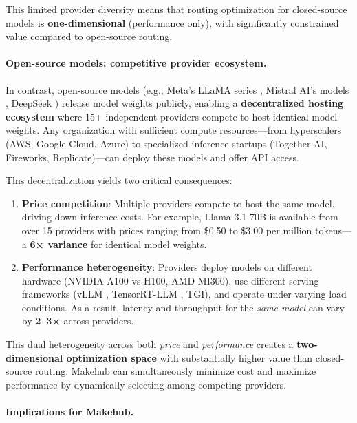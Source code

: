 \documentclass[english]{article}
\begin{document}
This limited provider diversity means that routing optimization for closed-source models is \textbf{one-dimensional} (performance only), with significantly constrained value compared to open-source routing.

\paragraph{Open-source models: competitive provider ecosystem.}

In contrast, open-source models (e.g., Meta's LLaMA series \parencite{llama2023,llama3_2024}, Mistral AI's models \parencite{mistral2023}, DeepSeek \parencite{deepseek_v3}) release model weights publicly, enabling a \textbf{decentralized hosting ecosystem} where 15+ independent providers compete to host identical model weights. Any organization with sufficient compute resources—from hyperscalers (AWS, Google Cloud, Azure) to specialized inference startups (Together AI, Fireworks, Replicate)—can deploy these models and offer API access.

This decentralization yields two critical consequences:

\begin{enumerate}
    \item \textbf{Price competition}: Multiple providers compete to host the same model, driving down inference costs. For example, Llama 3.1 70B is available from over 15 providers with prices ranging from \$0.50 to \$3.00 per million tokens—a \textbf{6× variance} for identical model weights.
    \item \textbf{Performance heterogeneity}: Providers deploy models on different hardware (NVIDIA A100 vs H100, AMD MI300), use different serving frameworks (vLLM \parencite{vllm2023}, TensorRT-LLM \parencite{tensorrt_llm}, TGI), and operate under varying load conditions. As a result, latency and throughput for the \emph{same model} can vary by \textbf{2--3×} across providers.
\end{enumerate}

This dual heterogeneity across both \emph{price} and \emph{performance} creates a \textbf{two-dimensional optimization space} with substantially higher value than closed-source routing. Makehub can simultaneously minimize cost and maximize performance by dynamically selecting among competing providers.

\paragraph{Implications for Makehub.}
\end{document}
